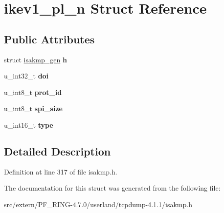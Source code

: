 \hypertarget{structikev1__pl__n}{
\section{ikev1\_\-pl\_\-n Struct Reference}
\label{structikev1__pl__n}
}
\subsection*{Public Attributes}
\begin{DoxyCompactItemize}
\item 
\hypertarget{structikev1__pl__n_acc817aabc5cf9b220053b790e57f6b77}{
struct \hyperlink{structisakmp__gen}{isakmp\_\-gen} {\bfseries h}}
\label{structikev1__pl__n_acc817aabc5cf9b220053b790e57f6b77}

\item 
\hypertarget{structikev1__pl__n_a45c9a1328b0500696fc79fae62380b10}{
u\_\-int32\_\-t {\bfseries doi}}
\label{structikev1__pl__n_a45c9a1328b0500696fc79fae62380b10}

\item 
\hypertarget{structikev1__pl__n_abd9f36d22b75830d2973879eb3afd8a0}{
u\_\-int8\_\-t {\bfseries prot\_\-id}}
\label{structikev1__pl__n_abd9f36d22b75830d2973879eb3afd8a0}

\item 
\hypertarget{structikev1__pl__n_a43ef401cd15dc57442e358026adec361}{
u\_\-int8\_\-t {\bfseries spi\_\-size}}
\label{structikev1__pl__n_a43ef401cd15dc57442e358026adec361}

\item 
\hypertarget{structikev1__pl__n_ac59d6ec6b388710179408043a67db5b1}{
u\_\-int16\_\-t {\bfseries type}}
\label{structikev1__pl__n_ac59d6ec6b388710179408043a67db5b1}

\end{DoxyCompactItemize}


\subsection{Detailed Description}


Definition at line 317 of file isakmp.h.



The documentation for this struct was generated from the following file:\begin{DoxyCompactItemize}
\item 
src/extern/PF\_\-RING-\/4.7.0/userland/tcpdump-\/4.1.1/isakmp.h\end{DoxyCompactItemize}
